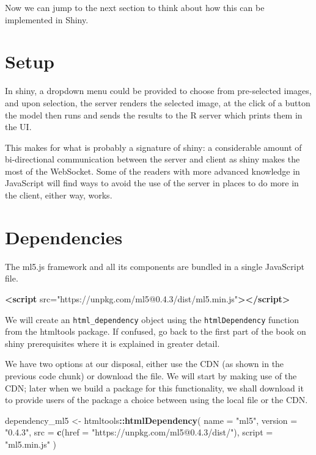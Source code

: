 \documentclass[
  10pt,
]{krantz}
\makeatletter
\newenvironment{Shaded}{\begin{snugshade}}{\end{snugshade}}
\newcommand{\DataTypeTok}[1]{\textcolor[rgb]{0.27,0.27,0.27}{#1}}
\newcommand{\KeywordTok}[1]{\textcolor[rgb]{0.27,0.27,0.27}{\textbf{#1}}}
\newcommand{\NormalTok}[1]{#1}
\newcommand{\OperatorTok}[1]{\textcolor[rgb]{0.43,0.43,0.43}{\textbf{#1}}}
\newcommand{\OtherTok}[1]{\textcolor[rgb]{0.37,0.37,0.37}{#1}}
\newcommand{\StringTok}[1]{\textcolor[rgb]{0.5,0.5,0.5}{#1}}
\newenvironment{kframe}{%
\medskip{}
\setlength{\fboxsep}{.8em}
 \def\at@end@of@kframe{}%
 \ifinner\ifhmode%
  \def\at@end@of@kframe{\end{minipage}}%
  \begin{minipage}{\columnwidth}%
 \fi\fi%
 \def\FrameCommand##1{\hskip\@totalleftmargin \hskip-\fboxsep
 \colorbox{shadecolor}{##1}\hskip-\fboxsep
     \hskip-\linewidth \hskip-\@totalleftmargin \hskip\columnwidth}%
 \MakeFramed {\advance\hsize-\width
   \@totalleftmargin\z@ \linewidth\hsize
   \@setminipage}}%
 {\par\unskip\endMakeFramed%
 \at@end@of@kframe}
\renewenvironment{Shaded}{\begin{kframe}}{\end{kframe}}
\makeatother
\begin{document}
Now we can jump to the next section to think about how this can be implemented in Shiny.

\hypertarget{shiny-complete-setup}{%
\section{Setup}\label{shiny-complete-setup}}

In shiny, a dropdown menu could be provided to choose from pre-selected images, and upon selection, the server renders the selected image, at the click of a button the model then runs and sends the results to the R server which prints them in the UI.

This makes for what is probably a signature of shiny: a considerable amount of bi-directional communication between the server and client as shiny makes the most of the WebSocket. Some of the readers with more advanced knowledge in JavaScript will find ways to avoid the use of the server in places to do more in the client, either way, works.

\hypertarget{shiny-complete-dependencies}{%
\section{Dependencies}\label{shiny-complete-dependencies}}

The ml5.js framework and all its components are bundled in a single JavaScript file.

\begin{Shaded}
\begin{Highlighting}[]
\KeywordTok{<script}\OtherTok{ src=}\StringTok{"https://unpkg.com/ml5@0.4.3/dist/ml5.min.js"}\KeywordTok{></script>}
\end{Highlighting}
\end{Shaded}

We will create an \texttt{html\_dependency} object using the \texttt{htmlDependency} function from the htmltools package. If confused, go back to the first part of the book on shiny prerequisites where it is explained in greater detail.

We have two options at our disposal, either use the CDN (as shown in the previous code chunk) or download the file. We will start by making use of the CDN; later when we build a package for this functionality, we shall download it to provide users of the package a choice between using the local file or the CDN.

\begin{Shaded}
\begin{Highlighting}[]
\NormalTok{dependency\_ml5 <{-}}\StringTok{ }\NormalTok{htmltools}\OperatorTok{::}\KeywordTok{htmlDependency}\NormalTok{(}
  \DataTypeTok{name =} \StringTok{"ml5"}\NormalTok{,}
  \DataTypeTok{version =} \StringTok{"0.4.3"}\NormalTok{,}
  \DataTypeTok{src =} \KeywordTok{c}\NormalTok{(}\DataTypeTok{href =} \StringTok{"https://unpkg.com/ml5@0.4.3/dist/"}\NormalTok{),}
  \DataTypeTok{script =} \StringTok{"ml5.min.js"}
\NormalTok{)}
\end{Highlighting}
\end{Shaded}
\end{document}
